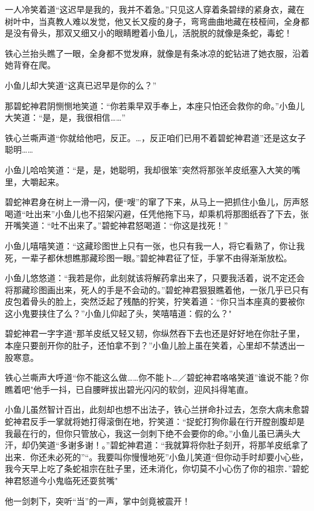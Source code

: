 \documentclass[12pt,oneside]{book}
\begin{document}
一人冷笑着道``这迟早是我的，我并不着急。''只见这人穿着条碧绿的紧身衣，藏在树叶中，当真教人难以发觉，他又长又瘦的身子，弯弯曲曲地藏在枝桠间，全身都是没有骨头，那双又细又小的眼睛瞪着小鱼儿，活脱脱的就像是条蛇，毒蛇！

铁心兰抬头瞧了一眼，全身都不觉发麻，就像是有条冰凉的蛇钻进了她衣服，沿着她背脊在爬。

小鱼儿却大笑道``这真已迟早是你的么？''

那碧蛇神君阴恻恻地笑道：``你若乘早双手奉上，本座只怕还会救你的命。''小鱼儿大笑道：``是，是，我很相信\ldots\ldots{}''

铁心兰嘶声道``你就给他吧，反正。\ldots，反正咱们已用不着碧蛇神君道''还是这女子聪明\ldots\ldots{}

小鱼儿哈哈笑道：``是，是，她聪明，我却很笨''突然将那张羊皮纸塞入大笑的嘴里，大嚼起来。

碧蛇神君身在树上一滑一闪，便``嗖''的窜了下来，从马上一把抓住小鱼儿，厉声怒喝道``吐出来''小鱼儿也不招架闪避，任凭他拖下马，却乘机将那图纸吞了下去，张开嘴笑道：``吐不出来了。''碧蛇神君怒喝道：``你这是找死！''

小鱼儿嘻嘻笑道：``这藏珍图世上只有一张，也只有我一人，将它看熟了，你让我死，一辈子都休想瞧那藏珍图一眼。''碧蛇神君征了怔，手掌不由得渐渐放松。

小鱼儿悠悠道：``我若是你，此刻就该将解药拿出来了，只要我活着，说不定还会将那藏珍图画出来，死人的手是不会动的。''碧蛇神君狠狠瞧着他，一张几乎已只有皮包着骨头的脸上，突然泛起了残酷的狞笑，狞笑着道：``你只当本座真的要被你这小鬼要挟住了么？''小鱼儿仰起了头，笑嘻嘻道：假的么？"

碧蛇神君一字字道``那羊皮纸又轻又韧，你纵然吞下去也还是好好地在你肚子里，本座只要剖开你的肚子，还怕拿不到？''小鱼儿脸上虽在笑着，心里却不禁透出一股寒意。

铁心兰嘶声大呼道``你不能这么做\ldots\ldots 你不能卜\ldots／碧蛇神君咯咯笑道''谁说不能？你瞧着吧"他手一抖，已自腰畔拔出碧光闪闪的软剑，迎风抖得笔直。

小鱼儿虽然智计百出，此刻却也想不出法子，铁心兰拼命扑过去，怎奈大病未愈碧蛇神君反手一掌就将她打得滚倒在地，狞笑道：``捉蛇打狗你最在行开膛剖腹却是我最在行的，但你只管放心，我这一剑刺下绝不会要你的命。''小鱼儿虽已满头大汗，却仍笑道``多谢多谢！。''碧蛇神君道：``我就算将你肚子刻开，将那羊皮纸拿了出来．你还未必死的''``。我要叫你慢慢地死''小鱼儿笑道``但你动手时却要小心些，我今天早上吃了条蛇祖宗在肚子里，还未消化，你切莫不小心伤了你的祖宗．''碧蛇神君怒道今小鬼临死还耍贫嘴"

他一剑刺下，突听``当''的一声，掌中剑竟被震开！
\end{document}
